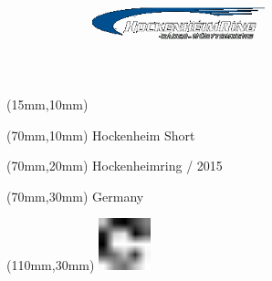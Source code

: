 \null\newpage
\begin{textblock*}{50mm}(15mm,10mm)%
\includegraphics[width=50mm]{LG/HOC.png}
\end{textblock*}
\begin{textblock*}{130mm}(70mm,10mm)%
{\fontsize{20}{20}\selectfont Hockenheim Short}\\
\end{textblock*}
\begin{textblock*}{120mm}(70mm,20mm)%
{\fontsize{16}{16}\selectfont Hockenheimring / 2015}\\
\end{textblock*}
\begin{textblock*}{120mm}(70mm,30mm)%
{\fontsize{12}{12}\selectfont Germany}
\end{textblock*}
\begin{textblock*}{30mm}(110mm,30mm)%
\centering
\includegraphics[height=15mm]{icons/fa-rotate-right.pdf}
\end{textblock*}
